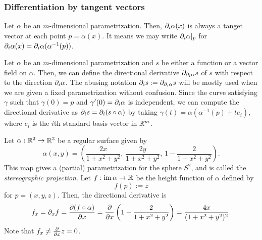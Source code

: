 \documentclass{../exp}
\def\a{\alpha}
\begin{document}

\subsubsection{Differentiation by tangent vectors}


\begin{ex}
Let $\a$ be an $m$-dimensional parametrization.
Then, $\pd_i\a(x)$ is always a tanget vector at each point $p=\a(x)$.
It means we may write $\pd_i\a|_p$ for $\pd_i\a(x)=\pd_i\a(\a^{-1}(p))$.
\end{ex}



\begin{ex}
Let $\a$ be an $m$-dimensional parametrization and $s$ be either a function or a vector field on $\a$.
Then, we can define the directional derivative $\pd_{\pd_i\a}s$ of $s$ with respect to the direction $\pd_i\a$.
The abusing notation $\pd_is:=\pd_{\pd_i\a}s$ will be mostly used when we are given a fixed parametrization without confusion.
Since the curve satisfying $\gamma$ such that $\gamma(0)=p$ and $\gamma'(0)=\pd_i\a$ is independent, we can compute the directional derivative as $\pd_is=\pd_i(s\o\a)$ by taking $\gamma(t)=\a(\a^{-1}(p)+te_i)$, where $e_i$ is the $i$th standard basis vector in $\mathbb{R}^m$.
\end{ex}

\begin{ex}
Let $\a:\R^2\to\R^3$ be a regular surface given by
\[\a(x,y)=\left(\frac{2x}{1+x^2+y^2},\,\frac{2y}{1+x^2+y^2},\,1-\frac2{1+x^2+y^2}\right).\]
This map gives a (partial) parametrization for the sphere $S^2$, and is called the \emph{stereographic projection}.
Let $f:\im\a\to\R$ be the height function of $\a$ defined by
\[f(p):=z\]
for $p=(x,y,z)$.
Then, the directional derivative is
\[f_x=\pd_xf=\pd{(f\o\a)}{x}=\pd{x}\left(1-\frac2{1+x^2+y^2}\right)=\frac{4x}{(1+x^2+y^2)^2}.\]
Note that $f_x\ne\pd{x}z=0$.
\end{ex}

\end{document}
